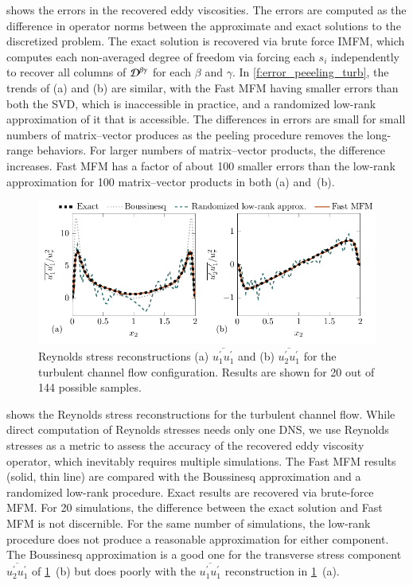 \documentclass[11pt,sort&compress]{elsarticle}
\begin{document}
 shows the errors in the recovered eddy viscosities.
The errors are computed as the difference in operator norms between the approximate and exact solutions to the discretized problem. 
The exact solution is recovered via brute force IMFM, which computes each non-averaged degree of freedom via forcing each $s_i$ independently to recover all columns of $\mathcal{D}^{\beta\gamma}$  for each $\beta$ and $\gamma$.
In \cref{f:error_peeeling_turb}, the trends of (a) and (b) are similar, with the Fast MFM having smaller errors than both the SVD, which is inaccessible in practice, and a randomized low-rank approximation of it that is accessible.
The differences in errors are small for small numbers of matrix--vector produces as the peeling procedure removes the long-range behaviors.
For larger numbers of matrix--vector products, the difference increases.
Fast MFM has a factor of about 100 smaller errors than the low-rank approximation for 100 matrix--vector products in both (a) and~(b).

\begin{figure}
    \centering
    \includegraphics[scale=1]{figures/turbulent-reconstructions.pdf}
    \caption{
        Reynolds stress reconstructions (a) $\overline{u_1^\prime u_1^\prime}$ and (b) $\overline{u_2^\prime u_1^\prime}$ for the turbulent channel flow configuration.
        Results are shown for 20 out of 144 possible samples.
    }
    \label{f:reconstructions}
\end{figure}

 shows the Reynolds stress reconstructions for the turbulent channel flow. 
While direct computation of Reynolds stresses needs only one DNS, we use Reynolds stresses as a metric to assess the accuracy of the recovered eddy viscosity operator, which inevitably requires multiple simulations.
The Fast MFM results (solid, thin line) are compared with the Boussinesq approximation and a randomized low-rank procedure.
Exact results are recovered via brute-force MFM.
For 20 simulations, the difference between the exact solution and Fast MFM is not discernible.
For the same number of simulations, the low-rank procedure does not produce a reasonable approximation for either component.
The Boussinesq approximation is a good one for the transverse stress component $\overline{u_2^\prime u_1^\prime}$ of \cref{f:reconstructions}~(b) but does poorly with the $\overline{u_1^\prime u_1^\prime}$ reconstruction in \cref{f:reconstructions}~(a).
\end{document}
